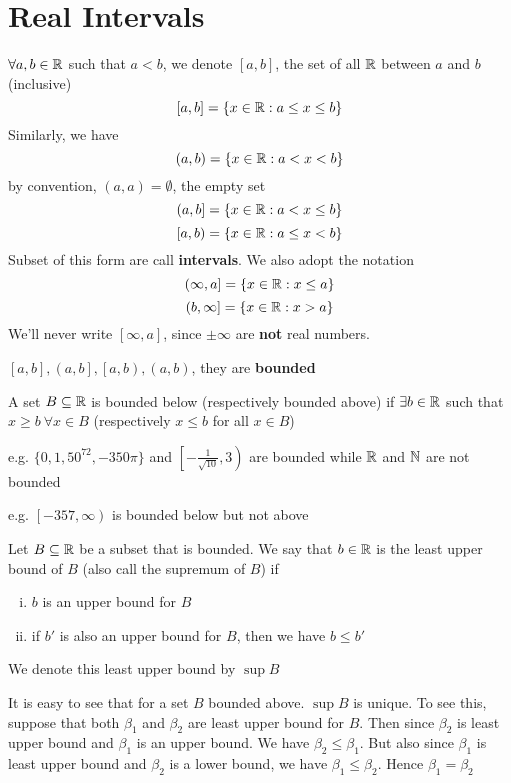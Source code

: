 \chapter{Real Intervals}
$\forall a, b \in \mathbb R$ such that $a < b$, we denote $\left[a,b\right]$, the set of all $\mathbb R$ between $a$ and $b$ (inclusive)
$$\left[a,b\right]=\{x\in \mathbb R : a \leq x \leq b\}$$
Similarly, we have
$$\left(a,b\right)=\{x\in \mathbb R : a < x < b\}$$
by convention, $\left(a,a\right)=\emptyset$, the empty set 
$$\left(a,b\right]=\{x\in \mathbb R : a < x \leq b\}$$
$$\left[a,b\right)=\{x\in \mathbb R : a \leq x < b\}$$
Subset of this form are call \textbf{intervals}. We also adopt the notation
$$\left(\infty,a\right]=\{x\in \mathbb R : x \leq a\}$$
$$\left(b,\infty\right]=\{x\in \mathbb R : x > a\}$$
We'll never write $\left[\infty,a\right]$, since $\pm\infty$ are \textbf{not} real numbers.

$\left[a,b\right],\left(a,b\right],\left[a,b\right),\left(a,b\right)$, they are \textbf{bounded}

\begin{definition}
A set $B \subseteq \mathbb R$ is bounded below 
(respectively bounded above) 
if $\exists b \in \mathbb R$ such that $x \geq b\ \forall x \in B$ (respectively $x\leq b$ for all $x \in B$)

e.g. $\{0, 1, 50^{72}, -350\pi\}$ and $\left[-\frac{1}{\sqrt{10}},3\right)$ are bounded while $\mathbb R$ and $\mathbb N$ are not bounded

e.g. $\left[-357,\infty\right)$ is bounded below but not above
\end{definition}

\begin{definition}
Let $B \subseteq \mathbb R$ be a subset that is bounded. We say that $b \in \mathbb R$ is the least upper bound of $B$ (also call the supremum of $B$) if

\begin{enumerate}[(i)]
    \item $b$ is an upper bound for $B$
    \item if $b'$ is also an upper bound for $B$, then we have $b \leq b'$
\end{enumerate}

We denote this least upper bound by $\sup B$

\end{definition}

\begin{remark}
It is easy to see that for a set $B$ bounded above. $\sup B$ is unique. 
To see this, suppose that both $\beta_1$ and $\beta_2$ are least upper bound for $B$. 
Then since $\beta_2$ is least upper bound and $\beta_1$ is an upper bound. We have $\beta_2 \leq \beta_1$. 
But also since $\beta_1$ is least upper bound and $\beta_2$ is a lower bound, we have $\beta_1 \leq \beta_2$. 
Hence $\beta_1 = \beta_2$
\end{remark}

